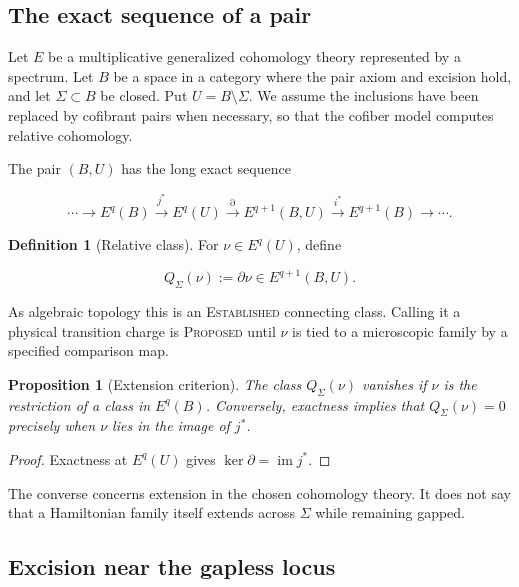 \documentclass[12pt]{article}
\newtheorem{proposition}[theorem]{Proposition}
\theoremstyle{definition}
\newtheorem{definition}[theorem]{Definition}
\theoremstyle{remark}
\newcommand{\EST}{\textnormal{\textsc{Established}}}
\newcommand{\PROP}{\textnormal{\textsc{Proposed}}}
\begin{document}
\subsection{The exact sequence of a pair}

Let $E$ be a multiplicative generalized cohomology theory represented by a
spectrum.  Let $B$ be a space in a category where the pair axiom and excision
hold, and let $\Sigma\subset B$ be closed.  Put
$U=B\setminus\Sigma$.  We assume the inclusions have been replaced by
cofibrant pairs when necessary, so that the cofiber model computes relative
cohomology.

The pair $(B,U)$ has the long exact sequence

\begin{equation}
\cdots\longrightarrow E^q(B)
\xrightarrow{j^*}E^q(U)
\xrightarrow{\partial}E^{q+1}(B,U)
\xrightarrow{i^*}E^{q+1}(B)
\longrightarrow\cdots.
\label{eq:long-exact-sequence}
\end{equation}

\begin{definition}[Relative class]
For $\nu\in E^q(U)$, define

\begin{equation}
  Q_\Sigma(\nu):=\partial\nu\in E^{q+1}(B,U).
  \label{eq:relative-charge}
\end{equation}

As algebraic topology this is an \EST{} connecting class.  Calling it a
physical transition charge is \PROP{} until $\nu$ is tied to a microscopic
family by a specified comparison map.
\end{definition}

\begin{proposition}[Extension criterion]
\label{prop:extension-criterion}
The class $Q_\Sigma(\nu)$ vanishes if $\nu$ is the restriction of a class in
$E^q(B)$.  Conversely, exactness implies that
$Q_\Sigma(\nu)=0$ precisely when $\nu$ lies in the image of $j^*$.
\end{proposition}

\begin{proof}
Exactness at $E^q(U)$ gives
$\ker\partial=\operatorname{im}j^*$.
\end{proof}

The converse concerns extension in the chosen cohomology theory.  It does
not say that a Hamiltonian family itself extends across $\Sigma$ while
remaining gapped.

\subsection{Excision near the gapless locus}
\end{document}
